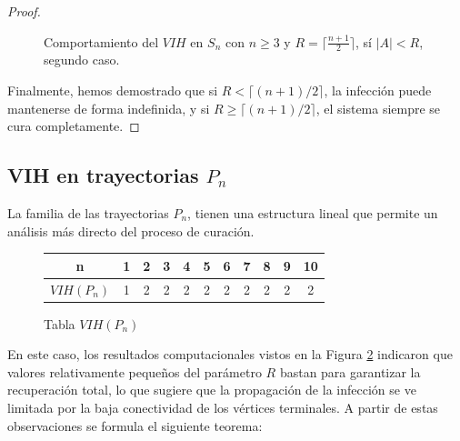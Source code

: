 \documentclass[12pt,titlepage,twoside,openright]{book}
\begin{document}
\begin{proof}
\begin{figure}[h]
\begin{subfigure}[h]{1\linewidth}
    \end{subfigure}
    \caption{Comportamiento del $VIH$ en $S_n$ con $n\geq3$ y $R=\lceil \frac{n+1}{2} \rceil$, s\'i $|A|<R$, segundo caso.}
    \label{SnyR=VIH,|A|<R(2)}
    \end{figure}

    Finalmente, hemos demostrado que si $R<\lceil (n+1)/2\rceil$, la infecci\'on puede mantenerse de forma indefinida, y si $R\ge \lceil (n+1)/2\rceil$, el sistema siempre se cura completamente. 
\end{proof}

\subsection{VIH en trayectorias $P_n$}
La familia de las trayectorias $P_n$, tienen una estructura lineal que permite un an\'alisis m\'as directo del proceso de curaci\'on.

\begin{figure}[h!]
    \centering
    \begin{tabular}{|c|cccccccccc|}
        \hline
        \textbf{n} & \textbf{1} & \textbf{2} & \textbf{3} & \textbf{4} & \textbf{5} & \textbf{6} & \textbf{7} & \textbf{8} & \textbf{9} & \textbf{10}\\
        \hline
        \textbf{$VIH(P_n)$} & 1 & 2 & 2 & 2 & 2 & 2 & 2 & 2 & 2 & 2 \\
        \hline
    \end{tabular}
    \caption{Tabla $VIH(P_n)$}
    \label{tabla:VIH(P_n)}
\end{figure}
En este caso, los resultados computacionales vistos en la Figura \ref{tabla:VIH(P_n)} indicaron que valores relativamente peque\~nos del par\'ametro $R$ bastan para garantizar la recuperaci\'on total, lo que sugiere que la propagaci\'on de la infecci\'on se ve limitada por la baja conectividad de los v\'ertices terminales.
A partir de estas observaciones se formula el siguiente teorema:
\end{document}
